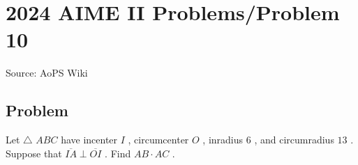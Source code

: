 \documentclass[12pt]{article}
\begin{document}
\section*{{2024 AIME II Problems/Problem 10}}
Source: AoPS Wiki

\subsection*{Problem}
Let $\triangle$ $ABC$ have incenter $I$ , circumcenter $O$ , inradius $6$ , and circumradius $13$ . Suppose that $\overline{IA} \perp \overline{OI}$ . Find $AB \cdot AC$ .
\end{document}
